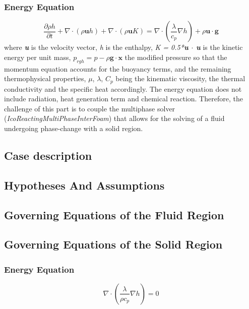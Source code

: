 \subsubsection*{Energy Equation}
\begin{equation}
\frac{\partial \rho h}{\partial t}+\nabla \cdot(\rho \boldsymbol{u} h)+\nabla \cdot(\rho \boldsymbol{u} K)=\nabla \cdot\left(\frac{\lambda}{c_{p}} \nabla h\right)+\rho \boldsymbol{u} \cdot \boldsymbol{g}
\label{4.2}
\end{equation}
where \textit{\textbf{u}} is the velocity vector, \textit{h} is the enthalpy, \textit{K = 0.5*\textbf{u $\cdot$ u}} is the kinetic energy per unit mass, \textit{$p_{rgh}=p-\rho\textbf{g}\cdot\textbf{x}$} the modified pressure so that the momentum equation accounts for the buoyancy terms, and the remaining thermophysical properties, $\mu$, $\lambda$, $C_p$ being the kinematic viscosity, the thermal conductivity and the specific heat accordingly. The energy equation does not include radiation, heat generation term and chemical reaction.
\newline
Therefore, the challenge of this part is to couple the multiphase solver (\textit{IcoReactingMultiPhaseInterFoam}) that allows for the solving of a fluid undergoing phase-change with a solid region.  
\subsection{Case description}
\subsection{Hypotheses And Assumptions}
\subsection{Governing Equations of the Fluid Region}

\subsection{Governing Equations of the Solid Region}
\subsubsection{Energy Equation}
\begin{equation}
\nabla \cdot\left(\frac{\lambda}{\rho c_{p}} \nabla h\right)=0
\label{4.3}
\end{equation}

